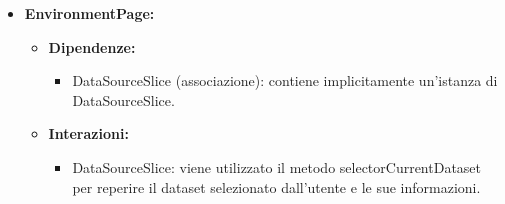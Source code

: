 \begin{itemize}
    \item \textbf{EnvironmentPage:}
          \begin{itemize}
              \item \textbf{Dipendenze:}
                    \begin{itemize}
                        \item DataSourceSlice (associazione): contiene implicitamente un'istanza di
                              DataSourceSlice.
                    \end{itemize}
              \item \textbf{Interazioni:}
                    \begin{itemize}
                        \item DataSourceSlice: viene utilizzato il metodo selectorCurrentDataset per reperire
                              il dataset selezionato dall'utente e le sue informazioni.
                    \end{itemize}
          \end{itemize}
\end{itemize}

